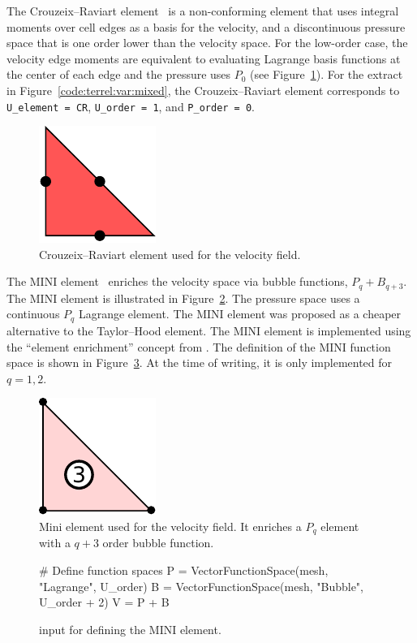 The Crouzeix--Raviart element~\citep{CrouzeixRaviart1973} is a
non-conforming element that uses integral moments over cell edges as
a basis for the velocity, and a discontinuous pressure space that is
one order lower than the velocity space.  For the low-order case,
the velocity edge moments are equivalent to evaluating Lagrange
basis functions at the center of each edge and the pressure uses
$P_0$ (see Figure~\ref{fig:terrel:CRElements}).  For the extract
in Figure~\ref{code:terrel:var:mixed}, the Crouzeix--Raviart element
corresponds to {\tt U\_element = CR}, {\tt U\_order = 1},  and {\tt P\_order = 0}.
%
\begin{figure}
  \center
  \includegraphics[width=\smallfig]{chapters/kirby-6/pdf/CR1.pdf}
  \caption{Crouzeix--Raviart element used for the velocity field.}
  \label{fig:terrel:CRElements}
\end{figure}

The MINI element~\citep{ArnoldBrezziFortin1984} enriches the velocity
space via bubble functions, $P_q + B_{q+3}$. The MINI element is
illustrated in Figure~\ref{fig:terrel:MINIElement}.  The pressure
space uses a continuous $P_{q}$ Lagrange element.  The MINI element
was proposed as a cheaper alternative to the Taylor--Hood element. The
MINI element is implemented using the ``element enrichment'' concept
from \ufl{}. The \ufl{} definition of the MINI function space is shown
in Figure~\ref{code:terrel:MINI}.  At the time of writing, it is only
implemented for $q=1, 2$.
%
\begin{figure}
  \center
  \includegraphics[width=\smallfig]{chapters/terrel/pdf/MINI.pdf}
  \caption{Mini element used for the velocity field. It enriches a $P_q$ element with
  a $q+3$ order bubble function.}
  \label{fig:terrel:MINIElement}
\end{figure}
%
\begin{figure}
\begin{python}
# Define function spaces
P = VectorFunctionSpace(mesh, "Lagrange", U_order)
B = VectorFunctionSpace(mesh, "Bubble", U_order + 2)
V = P + B
\end{python}
\caption{\ufl{} input for defining the MINI element.}
\label{code:terrel:MINI}
\end{figure}

